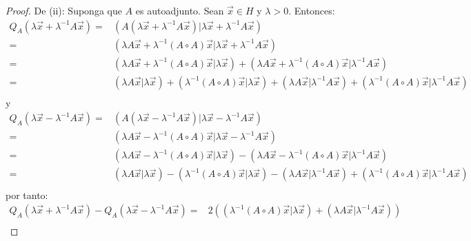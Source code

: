 \documentclass[12pt]{report}
\newcounter{it}
\theoremstyle{largebreak}
\newcommand\pint[2]{\ensuremath{\left(#1\big|#2\right)}}
\begin{document}
\begin{proof}
        De (ii): Suponga que $A$ es autoadjunto. Sean $\vec{x}\in H$ y $\lambda>0$. Entonces:
        \begin{equation*}
            \begin{split}
                Q_A(\lambda\vec{x}+\lambda^{-1}A\vec{x})=&\pint{A(\lambda\vec{x}+\lambda^{-1}A\vec{x})}{\lambda\vec{x}+\lambda^{-1}A\vec{x}} \\
                =&\pint{\lambda A\vec{x}+\lambda^{-1}(A\circ A)\vec{x}}{\lambda\vec{x}+\lambda^{-1}A\vec{x}} \\
                =&\pint{\lambda A\vec{x}+\lambda^{-1}(A\circ A)\vec{x}}{\lambda\vec{x}}+\pint{\lambda A\vec{x}+\lambda^{-1}(A\circ A)\vec{x}}{\lambda^{-1}A\vec{x}}\\
                =&\pint{\lambda A\vec{x}}{\lambda\vec{x}}+\pint{\lambda^{-1}(A\circ A)\vec{x}}{\lambda\vec{x}}+\pint{\lambda A\vec{x}}{\lambda^{-1}A\vec{x}}+\pint{\lambda^{-1}(A\circ A)\vec{x}}{\lambda^{-1}A\vec{x}}\\
            \end{split}
        \end{equation*}
        y
        \begin{equation*}
            \begin{split}
                Q_A(\lambda\vec{x}-\lambda^{-1}A\vec{x})=&\pint{A(\lambda\vec{x}-\lambda^{-1}A\vec{x})}{\lambda\vec{x}-\lambda^{-1}A\vec{x}} \\
                =&\pint{\lambda A\vec{x}-\lambda^{-1}(A\circ A)\vec{x}}{\lambda\vec{x}-\lambda^{-1}A\vec{x}} \\
                =&\pint{\lambda A\vec{x}-\lambda^{-1}(A\circ A)\vec{x}}{\lambda\vec{x}}-\pint{\lambda A\vec{x}-\lambda^{-1}(A\circ A)\vec{x}}{\lambda^{-1}A\vec{x}}\\
                =&\pint{\lambda A\vec{x}}{\lambda\vec{x}}-\pint{\lambda^{-1}(A\circ A)\vec{x}}{\lambda\vec{x}}-\pint{\lambda A\vec{x}}{\lambda^{-1}A\vec{x}}+\pint{\lambda^{-1}(A\circ A)\vec{x}}{\lambda^{-1}A\vec{x}}\\
            \end{split}
        \end{equation*}
        por tanto:
        \begin{equation*}
            \begin{split}
                Q_A(\lambda\vec{x}+\lambda^{-1}A\vec{x})-Q_A(\lambda\vec{x}-\lambda^{-1}A\vec{x})=&2(\pint{\lambda^{-1}(A\circ A)\vec{x}}{\lambda\vec{x}}+\pint{\lambda A\vec{x}}{\lambda^{-1}A\vec{x}})\\

\end{split}
\end{equation*}
\end{proof}
\end{document}
